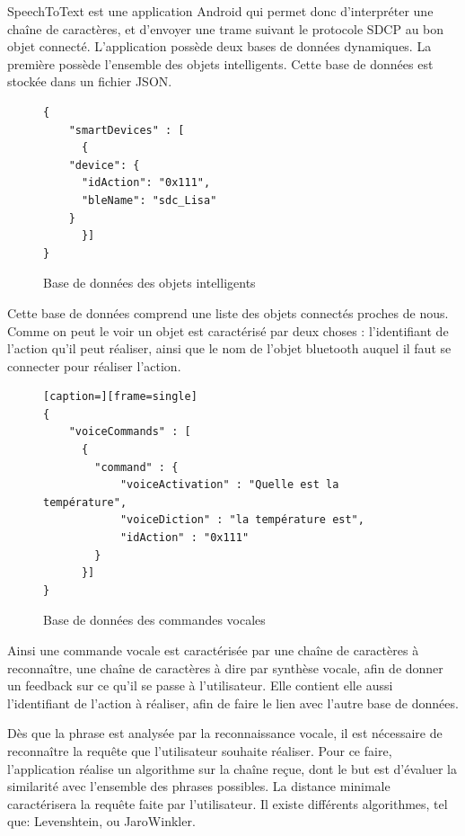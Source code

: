 SpeechToText est une application Android qui permet donc d'interpréter une chaîne de caractères, et d'envoyer une trame suivant le protocole SDCP au bon objet connecté. L'application possède deux bases de données dynamiques. La première possède l'ensemble des objets intelligents. Cette base de données est stockée dans un fichier JSON.

\begin{figure}[!ht]
         \centering
         	\begin{lstlisting}
{
    "smartDevices" : [
      {
	"device": {
	  "idAction": "0x111",
	  "bleName": "sdc_Lisa"
	}
      }]
}
		\end{lstlisting}
         \caption{Base de données des objets intelligents}
         \label{BDD_smart}
\end{figure}


Cette base de données comprend une liste des objets connectés proches de nous. Comme on peut le voir un objet est caractérisé par deux choses : l'identifiant de l'action qu'il peut réaliser, ainsi que le nom de l'objet bluetooth auquel il faut se connecter pour réaliser l'action.

\begin{figure}[!ht]
         \centering
	 \begin{lstlisting}[caption=][frame=single]
{
    "voiceCommands" : [
      {
        "command" : {
            "voiceActivation" : "Quelle est la température",
            "voiceDiction" : "la température est",
            "idAction" : "0x111"
        }
      }]
}
	 \end{lstlisting}
         \caption{Base de données des commandes vocales}
         \label{BDD_objects}
\end{figure}



Ainsi une commande vocale est caractérisée par une chaîne de caractères à reconnaître, une chaîne de caractères à dire par synthèse vocale, afin de donner un feedback sur ce qu'il se passe à l'utilisateur. Elle contient elle aussi l'identifiant de l'action à réaliser, afin de faire le lien avec l'autre base de données.

Dès que la phrase est analysée par la reconnaissance vocale, il est nécessaire de reconnaître la requête que l'utilisateur souhaite réaliser. Pour ce faire, l'application réalise un algorithme sur la chaîne reçue, dont le but est d'évaluer la similarité avec l'ensemble des phrases possibles. La distance minimale caractérisera la requête faite par l'utilisateur. Il existe différents algorithmes, tel que: Levenshtein, ou JaroWinkler.

